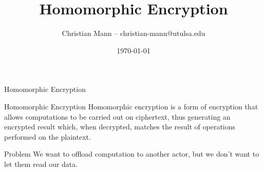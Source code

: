 \documentclass[12pt]{beamer}
\title[Introduction to Cryptography]{Homomorphic Encryption}
\author{Christian Mann -- christian-mann@utulsa.edu}
\institute{University of Tulsa\\
Tulsa, Oklahoma 74104}
\date{\today}
\begin{document}
\lstset{
language=python,                %
showspaces=false,               %
showstringspaces=false,         %
showtabs=false,                 %
tabsize=4,	                %
}

\newtheorem{mydef}{Definition}


\begin{frame}
\titlepage
\end{frame}

\begin{frame}{Homomorphic Encryption}
	\begin{block}{Homomorphic Encryption}
		Homomorphic encryption is a form of encryption that allows computations
		to be carried out on ciphertext, thus generating an encrypted result
		which, when decrypted, matches the result of operations performed on the
		plaintext.
	\end{block}

	\begin{block}{Problem}
		We want to offload computation to another actor, but we don't want to
		let them read our data.
	\end{block}
\end{frame}
\end{document}
